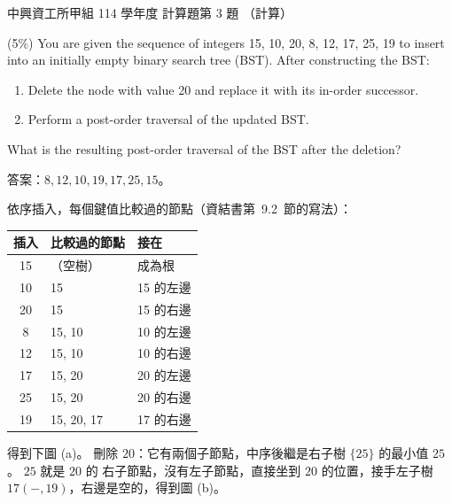 \begin{pastexam}[label={px:nchu-114-dsa-23}]{中興資工所甲組 114 學年度 計算題第 3 題}
（計算）

(5\%) You are given the sequence of integers 15, 10, 20, 8, 12, 17, 25, 19 to insert into an initially empty binary search tree (BST). After constructing the BST:
\begin{enumerate}[label=\Roman*.]
\item Delete the node with value 20 and replace it with its in-order successor.
\item Perform a post-order traversal of the updated BST.
\end{enumerate}
What is the resulting post-order traversal of the BST after the deletion?
\end{pastexam}

\begin{pastsoln}
答案：$8, 12, 10, 19, 17, 25, 15$。

依序插入，每個鍵值比較過的節點（資結書第~9.2~節的寫法）：
\begin{center}
\begin{tabular}{cll}
\toprule
插入 & 比較過的節點 & 接在 \\
\midrule
15 & （空樹） & 成為根 \\
10 & 15 & 15 的左邊 \\
20 & 15 & 15 的右邊 \\
8 & 15, 10 & 10 的左邊 \\
12 & 15, 10 & 10 的右邊 \\
17 & 15, 20 & 20 的左邊 \\
25 & 15, 20 & 20 的右邊 \\
19 & 15, 20, 17 & 17 的右邊 \\
\bottomrule
\end{tabular}
\end{center}

得到下圖 (a)。 刪除 $20$：它有兩個子節點，中序後繼是右子樹 $\{25\}$ 的最小值 $25$。 $25$ 就是 $20$ 的
右子節點，沒有左子節點，直接坐到 $20$ 的位置，接手左子樹 $17(-,19)$，右邊是空的，得到圖 (b)。

\begin{center}
\begin{minipage}{0.48\linewidth}\centering
{}


\end{minipage}
\end{center}
\end{pastsoln}
